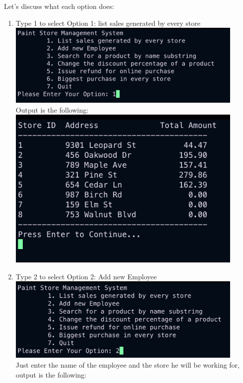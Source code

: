 \documentclass[a4paper,11pt]{article}
\begin{document}
\noindent
Let's discuss what each option does:
\begin{enumerate}[label=-]
    \item Type 1 to select Option 1: list sales generated by every store\\
        \includegraphics[width=0.9\textwidth]{images/menu_option_1_1.png}\\
        Output is the following:\\
        \includegraphics[width=0.9\textwidth]{images/menu_option_1_2.png}
    \item Type 2 to select Option 2: Add new Employee\\
        \includegraphics[width=0.9\textwidth]{images/menu_option_2_1.png}\\
        Just enter the name of the employee and the store he will be working
        for, output is the following:\\

\end{enumerate}
\end{document}
